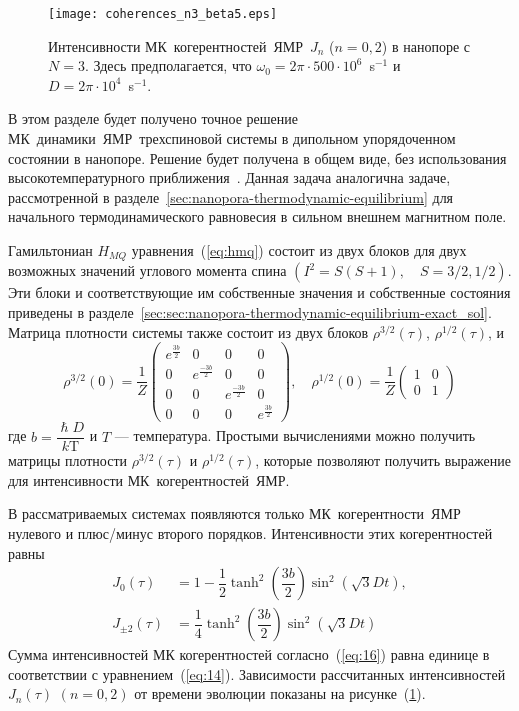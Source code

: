\begin{figure}[H]
  \centering
 	\texttt{[image: coherences\_n3\_beta5.eps]}
	\caption{
	  Интенсивности МК~когерентностей~ЯМР~$J_{n}$ ($n=0, 2$) в нанопоре с $N=3$.
      Здесь предполагается, что $\omega_{0} = 2\pi \cdot 500 \cdot 10^{6}$~s$^{-1}$ и $D = 2\pi \cdot 10^{4}$~s$^{-1}$.
	}
	\label{fig:1}
\end{figure}

В этом разделе будет получено точное решение МК~динамики~ЯМР~трехспиновой системы в дипольном упорядоченном состоянии в нанопоре.
Решение будет получена в общем виде, без использования высокотемпературного приближения~\cite{Goldman1970}.
Данная задача аналогична задаче, рассмотренной в разделе~\ref{sec:nanopora-thermodynamic-equilibrium}
для начального термодинамического равновесия в сильном внешнем магнитном поле.

Гамильтониан $H_{MQ}$ уравнения~(\ref{eq:hmq}) состоит из двух блоков для двух возможных значений углового момента спина $(I^2 = S(S+1), \quad S=3/2,1/2)$.
Эти блоки и соответствующие им собственные значения и собственные состояния приведены
в разделе~\ref{sec:sec:nanopora-thermodynamic-equilibrium-exact_sol}.
Матрица плотности системы также состоит из двух блоков $\rho^{3/2}(\tau)$, $\rho^{1/2}(\tau)$, и
%
\begin{equation}
  \label{eq:15}
  \rho^{3/2}(0) = \dfrac 1 Z
  \begin{pmatrix}
    e^{\frac{3b}{2}} & 0 & 0 & 0
    \\
    0 & e^{\frac{-3b}{2}} & 0 & 0
    \\
    0 & 0 & e^{\frac{-3b}{2}} & 0
    \\
    0 & 0 & 0 & e^{\frac{3b}{2}}
  \end{pmatrix},
  \quad
  \rho^{1/2}(0) = \dfrac 1 Z
  \begin{pmatrix}
    	1 & 0
    \\
    0 & 1
  \end{pmatrix}
\end{equation}
%
где $b = \dfrac{\hslash D}{k\mathrm{T}}$ и $T$ --- температура.
Простыми вычислениями можно получить матрицы плотности $\rho^{3/2}(\tau)$ и $\rho^{1/2}(\tau)$,
которые позволяют получить выражение для интенсивности МК~когерентностей~ЯМР.

В рассматриваемых системах появляются только МК~когерентности~ЯМР нулевого и плюс/минус второго порядков.
Интенсивности этих когерентностей равны
%
\begin{equation}
  \begin{split}
    \label{eq:16}
    J_0(\tau) & = 1
    - \dfrac 1 2 \tanh^2\left( \dfrac{3b}{2} \right)
      \sin^2 \left( \sqrt{3} Dt \right),
    \\
    J_{\pm2}(\tau) & = \dfrac{1}{4}
      \tanh^2 \left( \dfrac{3b}{2} \right)
      \sin^2 \left( \sqrt{3} Dt \right)
  \end{split}
\end{equation}
%
Сумма интенсивностей МК когерентностей согласно~(\ref{eq:16}) равна единице в соответствии с уравнением~(\ref{eq:14}).
Зависимости рассчитанных интенсивностей $J_{n}(\tau)$ $(n=0,2)$ от времени эволюции показаны на рисунке~(\ref{fig:1}).

